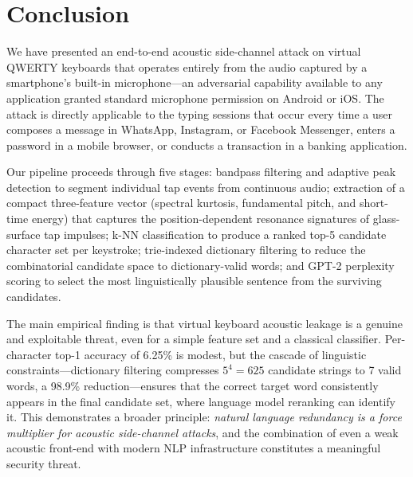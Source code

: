 \documentclass[conference]{IEEEtran}
\begin{document}
\section{Conclusion}\label{sec:conclusion}

We have presented an end-to-end acoustic side-channel attack on
virtual QWERTY keyboards that operates entirely from the audio
captured by a smartphone's built-in microphone---an adversarial
capability available to any application granted standard microphone
permission on Android or iOS.
The attack is directly applicable to the typing sessions that occur
every time a user composes a message in WhatsApp, Instagram, or
Facebook Messenger, enters a password in a mobile browser, or
conducts a transaction in a banking application.

Our pipeline proceeds through five stages: bandpass filtering and
adaptive peak detection to segment individual tap events from
continuous audio; extraction of a compact three-feature vector
(spectral kurtosis, fundamental pitch, and short-time energy) that
captures the position-dependent resonance signatures of glass-surface
tap impulses; k-NN classification to produce a ranked top-5
candidate character set per keystroke; trie-indexed dictionary
filtering to reduce the combinatorial candidate space to
dictionary-valid words; and GPT-2 perplexity scoring to select
the most linguistically plausible sentence from the surviving
candidates.

The main empirical finding is that virtual keyboard acoustic
leakage is a genuine and exploitable threat, even for a simple
feature set and a classical classifier.
Per-character top-1 accuracy of 6.25\% is modest, but the cascade
of linguistic constraints---dictionary filtering compresses $5^4 = 625$
candidate strings to 7 valid words, a 98.9\% reduction---ensures
that the correct target word consistently appears in the final
candidate set, where language model reranking can identify it.
This demonstrates a broader principle: \emph{natural language
redundancy is a force multiplier for acoustic side-channel attacks},
and the combination of even a weak acoustic front-end with modern
NLP infrastructure constitutes a meaningful security threat.
\end{document}
